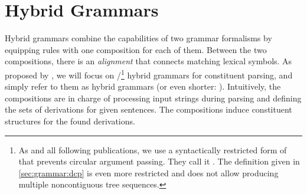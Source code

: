 \documentclass[../../document.tex]{subfiles}
\begin{document}
    \section{Hybrid Grammars}\label{sec:grammar:hybrid}
    Hybrid grammars \citep{Ned14,Geb17,Geb20} combine the capabilities of two grammar formalisms by equipping rules with one composition for each of them.
    Between the two compositions, there is an \emph{alignment} that connects matching lexical symbols.
    As proposed by \citet{Ned14}, we will focus on /\footnote{
        As \citet{Ned14} and all following publications, we use a syntactically restricted form of  that prevents circular argument passing. They call it .
        The definition given in \cref{sec:grammar:dcp} is even more restricted and does not allow producing multiple noncontiguous tree sequences.
    } hybrid grammars for constituent parsing, and simply refer to them as hybrid grammars (or even shorter: ).
    Intuitively, the  compositions are in charge of processing input strings during parsing and defining the sets of derivations for given sentences.
    The  compositions induce constituent structures for the found derivations.
\end{document}
